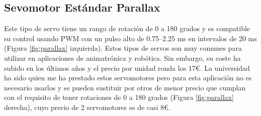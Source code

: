 \subsection{Sevomotor Estándar Parallax}
Este tipo de servo tiene un rango de rotación de 0 a 180 grados y es compatible su control usando \ac{PWM} con un pulso alto de 0.75–2.25 ms en intervalos de 20 ms (Figura \ref{fig:parallax} izquierda). Estos tipos de servos son muy comunes para utilizar en aplicaciones de animatrónica y robótica. Sin embargo, su coste ha subido en los últimos años y el precio por unidad ronda los 17€. La universidad ha sido quien me ha prestado estos servomotores pero para esta aplicación no es necesario usarlos y se pueden sustituir por otros de menor precio que cumplan con el requisito de tener rotaciones de 0 a 180 grados (Figura \ref{fig:parallax} derecha), cuyo precio de 2 servomotores es de casi 8€. 


